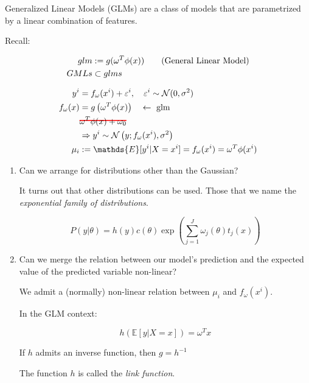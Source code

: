 Generalized Linear Models (GLMs) are a class of models that are
parametrized by a linear combination of features.

Recall:

\begin{align*}
	glm  & := g(\omega^T\phi(x))  \tag{\text{General Linear Model}} \\
	GMLs & \subset glms
\end{align*}

\newcommand\hcancel[2][black]{\setbox0=\hbox{$#2$}%
	\rlap{\raisebox{.45\ht0}{\textcolor{#1}{\rule{\wd0}{1pt}}}}#2}


\begin{align*}
	y^i         & = f_\omega(x^i) + \varepsilon^i, \quad \varepsilon^i \sim \mathcal{N}(0, \sigma^2) \\
	f_\omega(x) & = g\left(\omega^T\phi(x)\right) \quad \leftarrow \text{ glm}                       \\
	            & \hcancel[red]{\omega^T\phi(x) + \omega_0}                                          \\
	            & \Rightarrow y^i \sim \mathcal{N}\left(y; f_\omega(x^i), \sigma^2\right)            \\
	\mu_i       & := \mathds{E}[y^i  | X = x^i] = f_\omega(x^i) = \omega^T\phi(x^i)
\end{align*}

\begin{enumerate}
	\item Can we arrange for distributions other than the Gaussian?

	      It turns out that other distributions can be used. Those that
	      we name the \emph{exponential family of distributions}.

	      \begin{equation*}
		      P(y | \theta) = h(y)c(\theta) \exp\left(\sum_{j=1}^J \omega_j(\theta)t_j(x)\right)
	      \end{equation*}

	\item Can we merge the relation between our model's prediction
	      and the expected value of the predicted variable non-linear?

	      We admit a (normally) non-linear relation between $\mu_i$ and $f_\omega(x^i)$.

	      In the GLM context:

	      \begin{equation*}
		      \boxed{
			      h\left(\mathds{E} [y | X = x] \right) = \omega^T x
		      }
	      \end{equation*}

	      If $h$ admits an inverse function, then $g = h^{-1}$

	      The function $h$ is called the \emph{link function}.


\end{enumerate}

